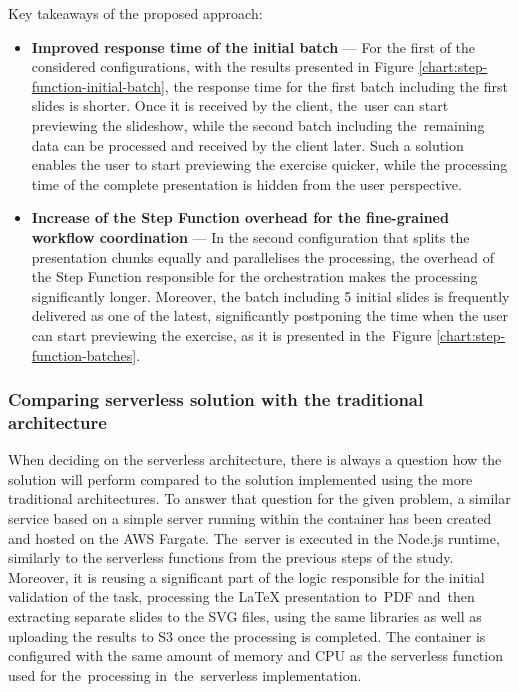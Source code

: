 Key takeaways of the proposed approach:

\begin{itemize}
   \item \textbf{Improved response time of the initial batch} --- For the first of the considered configurations, with the results presented in Figure \ref{chart:step-function-initial-batch}, the response time for the first batch including the first slides is shorter.
   Once it is received by the client, the~user can start previewing the slideshow, while the second batch including the~remaining data can be processed and received by the client later.
   Such a solution enables the user to start previewing the exercise quicker, while the processing time of the complete presentation is hidden from the user perspective.
   \item \textbf{Increase of the Step Function overhead for the fine-grained workflow coordination} --- In the second configuration that splits the presentation chunks equally and parallelises the processing, the overhead of the Step Function responsible for the orchestration makes the processing significantly longer.
   Moreover, the batch including 5 initial slides is frequently delivered as one of the latest, significantly postponing the time when the user can start previewing the exercise, as it is presented in the~Figure \ref{chart:step-function-batches}.
\end{itemize}

\subsubsection{Comparing serverless solution with the traditional architecture}

When deciding on the serverless architecture, there is always a question how the solution will perform compared to the solution implemented using the more traditional architectures.
To answer that question for the given problem, a similar service based on a simple server running within the container has been created and hosted on the AWS Fargate. 
The~server is executed in the Node.js runtime, similarly to the serverless functions from the previous steps of the study.
Moreover, it is reusing a significant part of the logic responsible for the initial validation of the task, processing the LaTeX presentation to~PDF and~then extracting separate slides to the SVG files, using the same libraries as well as uploading the results to S3 once the processing is completed.
The container is configured with the same amount of memory and CPU as the serverless function used for the~processing in~the~serverless implementation.


